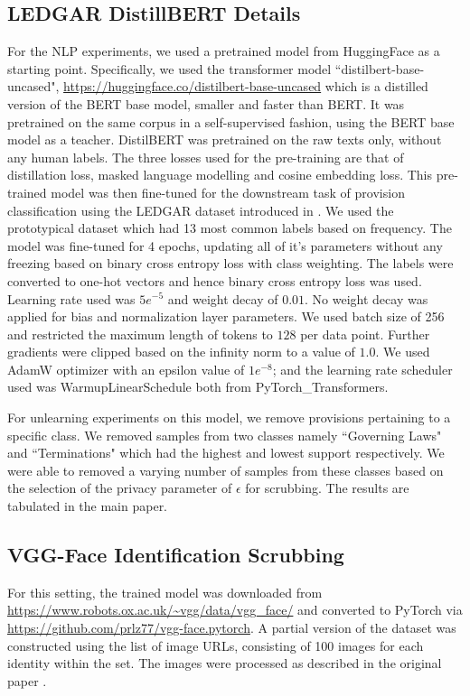 \subsection{LEDGAR DistillBERT Details}
For the NLP experiments, we used a pretrained model from HuggingFace as a starting point. Specifically, we used the transformer model ``distilbert-base-uncased", \url{https://huggingface.co/distilbert-base-uncased} which is a distilled version of the BERT base model, smaller and faster than BERT. It was pretrained on the same corpus in a self-supervised fashion, using the BERT base model as a teacher. DistilBERT \cite{sanh2019distilbert} was pretrained on the raw texts only, without any human labels. The three losses used for the pre-training are that of distillation loss, masked language modelling and cosine embedding loss. This pre-trained model was then fine-tuned for the downstream task of provision classification using the LEDGAR dataset introduced in \cite{tuggener2020ledgar}. We used the prototypical dataset which had 13 most common labels based on frequency. The model was fine-tuned for 4 epochs, updating all of it's parameters without any freezing based on binary cross entropy loss with class weighting. The labels were converted to one-hot vectors and hence binary cross entropy loss was used. Learning rate used was $5e^{-5}$ and weight decay of $0.01$. No weight decay was applied for bias and normalization layer parameters. We used batch size of 256 and restricted the maximum length of tokens to $128$ per data point. Further gradients were clipped based on the infinity norm to a value of $1.0$. We used AdamW optimizer with an epsilon value of $1e^{-8}$; and the learning rate scheduler used was WarmupLinearSchedule both from PyTorch\_Transformers. 

For unlearning experiments on this model, we remove provisions pertaining to a specific class. We removed samples from two classes namely ``Governing Laws" and ``Terminations" which had the highest and lowest support respectively. We were able to removed a varying number of samples from these classes based on the selection of the privacy parameter of $\epsilon$ for scrubbing. The results are tabulated in the main paper.

\subsection{VGG-Face Identification Scrubbing}
For this setting, the trained model was downloaded from \url{https://www.robots.ox.ac.uk/~vgg/data/vgg_face/} and converted to PyTorch via \url{https://github.com/prlz77/vgg-face.pytorch}. A partial version of the dataset was constructed using the list of image URLs, consisting of 100 images for each identity within the set. The images were processed as described in the original paper \cite{Parkhi15}.

